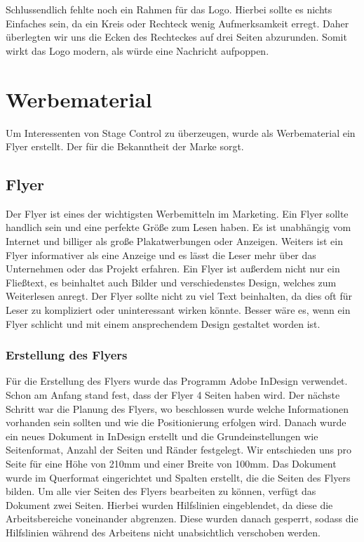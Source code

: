 Schlussendlich fehlte noch ein Rahmen für das Logo. Hierbei sollte es nichts Einfaches sein, da ein Kreis oder Rechteck wenig Aufmerksamkeit erregt. Daher überlegten wir uns die Ecken des Rechteckes auf drei Seiten abzurunden. Somit wirkt das Logo modern, als würde eine Nachricht aufpoppen. 

\section{Werbematerial}
Um Interessenten von Stage Control zu überzeugen, wurde als Werbematerial ein Flyer erstellt. Der für die Bekanntheit der Marke sorgt.

\subsection{Flyer}
Der Flyer ist eines der wichtigsten Werbemitteln im Marketing. Ein Flyer sollte handlich sein und eine perfekte Größe zum Lesen haben. Es ist unabhängig vom Internet und billiger als große Plakatwerbungen oder Anzeigen. Weiters ist ein Flyer informativer als eine Anzeige und es lässt die Leser mehr über das Unternehmen oder das Projekt erfahren. Ein Flyer ist außerdem nicht nur ein Fließtext, es beinhaltet auch Bilder und verschiedenstes Design, welches zum Weiterlesen anregt. Der Flyer sollte nicht zu viel Text beinhalten, da dies oft für Leser zu kompliziert oder uninteressant wirken könnte. Besser wäre es, wenn ein Flyer schlicht und mit einem ansprechendem Design gestaltet worden ist. \parencite{VorteilevonFlyern}

\subsubsection{Erstellung des Flyers}
Für die Erstellung des Flyers wurde das Programm Adobe InDesign verwendet. Schon am Anfang stand fest, dass der Flyer 4 Seiten haben wird. Der nächste Schritt war die Planung des Flyers, wo beschlossen wurde welche Informationen vorhanden sein sollten und wie die Positionierung erfolgen wird. Danach wurde ein neues Dokument in InDesign erstellt und die Grundeinstellungen wie Seitenformat, Anzahl der Seiten und Ränder festgelegt. Wir entschieden uns pro Seite für eine Höhe von 210mm und einer Breite von 100mm. Das Dokument wurde im Querformat eingerichtet und Spalten erstellt, die die Seiten des Flyers bilden. Um alle vier Seiten des Flyers bearbeiten zu können, verfügt das Dokument zwei Seiten. Hierbei wurden Hilfslinien eingeblendet, da diese die Arbeitsbereiche voneinander abgrenzen. Diese wurden danach gesperrt, sodass die Hilfslinien während des Arbeitens nicht unabsichtlich verschoben werden. 

